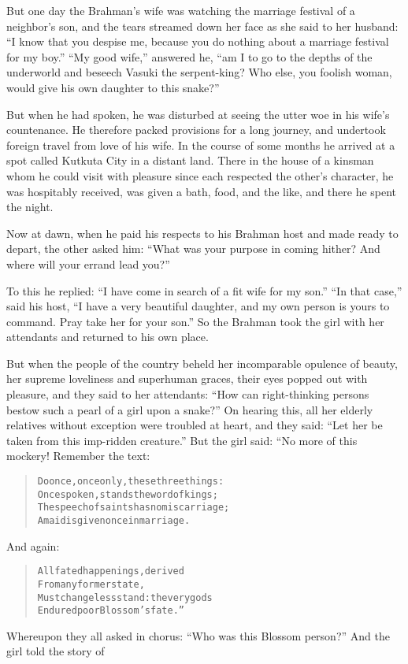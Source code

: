 \documentclass[article, twoside, 14pt]{memoir}
\renewenvironment{verbatim}{%
\begin{quote}%
\vskip -10pt%
\begin{alltt}\normalfont\large}{\end{alltt}%
\end{quote}%
\vskip -10pt
} %
\begin{document}
But one day the Brahman's wife was watching the marriage festival
of a neighbor's son, and the tears streamed down her face as she
said to her husband:
``I know that you despise me, because you do nothing about a marriage festival for my boy.''
``My good wife,'' answered he,
``am I to go to the depths of the underworld and beseech Vasuki the serpent-king? Who else, you foolish woman, would give his own daughter to this snake?''

But when he had spoken, he was disturbed at seeing the utter woe in
his wife's countenance. He therefore packed provisions for a long
journey, and undertook foreign travel from love of his wife. In the
course of some months he arrived at a spot called Kutkuta City in a
distant land. There in the house of a kinsman whom he could visit
with pleasure since each respected the other's character, he was
hospitably received, was given a bath, food, and the like, and
there he spent the night.

Now at dawn, when he paid his respects to his Brahman host and made
ready to depart, the other asked him:
``What was your purpose in coming hither? And where will your errand lead you?''

To this he replied:
``I have come in search of a fit wife for my son.''
``In that case,'' said his host,
``I have a very beautiful daughter, and my own person is yours to command. Pray take her for your son.''
So the Brahman took the girl with her attendants and returned to
his own place.

But when the people of the country beheld her incomparable opulence
of beauty, her supreme loveliness and superhuman graces, their eyes
popped out with pleasure, and they said to her attendants:
``How can right-thinking persons bestow such a pearl of a girl upon a snake?''
On hearing this, all her elderly relatives without exception
were troubled at heart, and they said:
``Let her be taken from this imp-ridden creature.'' But the girl
said: “No more of this mockery! Remember the text:

\begin{verbatim}
Do once, once only, these three things:
Once spoken, stands the word of kings;
The speech of saints has no miscarriage;
A maid is given once in marriage.
\end{verbatim}
And again:

\begin{verbatim}
All fated happenings, derived
    From any former state,
Must changeless stand: the very gods
    Endured poor Blossom's fate.”
\end{verbatim}
Whereupon they all asked in chorus:
``Who was this Blossom person?'' And the girl told the story of
\label{s27}
\end{document}
